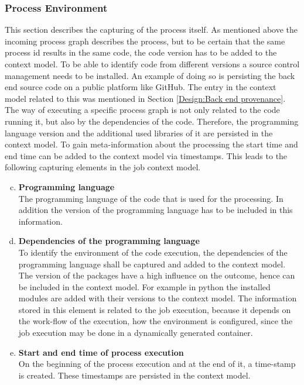 \documentclass[draft,final]{vutinfth} %
\begin{document}
\subsubsection{Process Environment}\label{Job:Process Data}
This section describes the capturing of the process itself. As mentioned above the incoming process graph describes the process, but to be certain that the same process id results in the same code, the code version has to be added to the context model. To be able to identify code from different versions a source control management needs to be installed. An example of doing so is persisting the back end source code on a public platform like GitHub. The entry in the context model related to this was mentioned in Section \ref{Design:Back end provenance}.  \\
The way of executing a specific process graph is not only related to the code running it, but also by the dependencies of the code. Therefore, the programming language version and the additional used libraries of it are persisted in the context model. To gain meta-information about the processing the start time and end time can be added to the context model via timestamps. This leads to the following capturing elements in the job context model.

\begin{enumerate}[(a)]
	\setcounter{enumi}{2}
	\item \textbf{Programming language}\\
	The programming language of the code that is used for the processing. In addition the version of the programming language has to be included in this information.
	\item \textbf{Dependencies of the programming language}\\
	To identify the environment of the code execution, the dependencies of the programming language shall be captured and added to the context model. The version of the packages have a high influence on the outcome, hence can be included in the context model. For example in python the installed modules are added with their versions to the context model. The information stored in this element is related to the job execution, because it depends on the work-flow of the execution, how the environment is configured, since the job execution may be done in a dynamically generated container.
	\item \textbf{Start and end time of process execution}\\
	On the beginning of the process execution and at the end of it, a time-stamp is created. These timestamps are persisted in the context model.
\end{enumerate}
\end{document}
